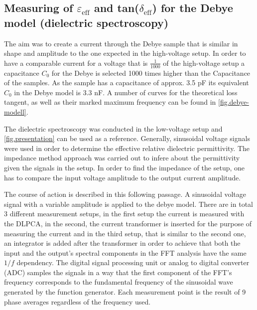    

\subsection{Measuring of $\varepsilon_{\textrm{eff}}$ and tan($\delta_{\textrm{eff}}$) for the Debye model (dielectric spectroscopy)}
\label{spectroscopy}
The aim was to create a current through the Debye sample that is similar in shape and amplitude to the one expected in the high-voltage setup. In order to have a comparable current for a voltage that is $\frac{1}{1000}$ of the high-voltage setup a capacitance $C_0$ for the Debye is selected 1000 times higher than the Capacitance of the samples. As the sample has a capacitance of approx. 3.5 pF its equivalent $C_0$ in the Debye model is 3.3 nF.
A number of curves for the theoretical loss tangent, as well as their marked maximum frequency can be found in \ref{fig.debye-modell}.

The dielectric spectroscopy was conducted in the low-voltage setup and \ref{fig.presentation} can be used as a reference.
Generally, sinusoidal voltage signals were used in order to determine the effective relative dielectric permittivity.
The impedance method \cite{Kramer} approach was carried out to infere about the permittivity given the signals in the setup.
In order to find the impedance of the setup, one has to compare the input voltage amplitude to the output current amplitude.

The course of action is described in this following passage.
\newline
A sinusoidal voltage signal with a variable amplitude is applied to the debye model. There are in total 3 different measurement setups,
in the first setup the current is measured with the DLPCA, in the second, the current transformer is inserted for the purpose of measuring 
the current and in the third setup, that is similar to the second one, an integrator is added after the transformer in order
to achieve that both the input and the output's spectral components in the FFT analysis have the same $1/f$ dependency.
The digital signal processing unit or analog to digital converter (ADC) samples the signals in a way that 
the first component of the FFT's frequency corresponds to the fundamental frequency
of the sinusoidal wave generated by the function generator. Each measurement point is the result of 9 phase averages regardless of the frequency used.



